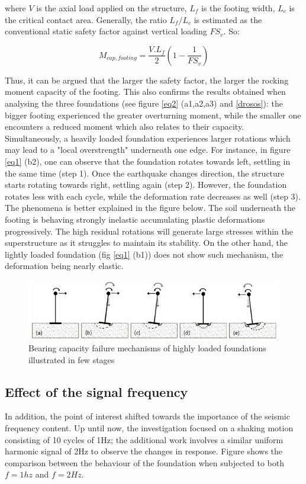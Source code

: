  where $V$ is the axial load applied on the structure, $L_f$ is the footing width, $L_c$ is the critical contact area. Generally, the ratio $L_f/L_c$ is estimated as the conventional static safety factor against vertical loading $FS_v$. So:
 
 \begin{equation}
 M_{cap,footing} = \frac{V.L_f}{2}(1-\frac{1}{FS_v})
 \end{equation} 	
 
 Thus, it can be argued that the larger the safety factor, the larger the rocking moment capacity of the footing. This also confirms the results obtained when analysing the three foundations (see figure \ref{eq2} (a1,a2,a3) and \ref{drosos}): the bigger footing experienced the greater overturning moment, while the smaller one encounters a reduced moment which also relates to their capacity. Simultaneously, a heavily loaded foundation experiences larger rotations which may lead to a "local overstrength" underneath one edge. For instance, in figure \ref{eq1} (b2), one can observe that the foundation rotates towards left, settling in the same time (step 1). Once the earthquake changes direction, the structure starts rotating towards right, settling again (step 2). However, the foundation rotates less with each cycle, while the deformation rate decreases as well (step 3). The phenomena is better explained in the figure below. The soil underneath the footing is behaving strongly inelastic accumulating plastic deformations progressively. The high residual rotations will generate large stresses within the superstructure as it struggles to maintain its stability. On the other hand, the lightly loaded foundation (fig \ref{eq1} (b1)) does not show such mechanism, the deformation being nearly elastic. 
 
  \begin{figure}[!h]
  	\centering
  	\includegraphics[width=0.7 \linewidth]{"bearing"}
  	\caption{Bearing capacity failure mechanisms of highly loaded foundations illustrated in few stages}
  	\label{bearingc}
  \end{figure}
 
 \pagebreak
 
 \newpage
 \subsection{Effect of the signal frequency}
 In addition, the point of interest shifted towards the importance of the seismic frequency content. Up until now, the investigation focused on a shaking motion consisting of 10 cycles of 1Hz; the additional work involves a similar uniform harmonic signal of 2Hz to observe the changes in response. Figure shows the comparison between the behaviour of the foundation when subjected to both $f=1hz$ and $f=2Hz$.
 
